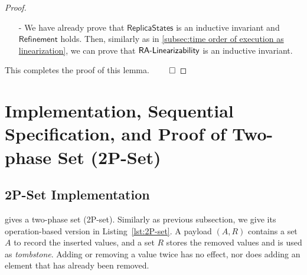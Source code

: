 \begin {proof}
\begin{itemize}
\item[-] We have already prove that $\mathsf{ReplicaStates}$ is an inductive invariant and $\mathsf{Refinement}$ holds. Then, similarly as in \sectionautorefname \ref{subsec:time order of execution as linearization}, we can prove that $\mathsf{RA\text{-}Linearizability{}}$ is an inductive invariant.
\end{itemize}

This completes the proof of this lemma. $\qed$
\end {proof}








\section{Implementation, Sequential Specification, and Proof of Two-phase Set (2P-Set)}
\label{sec:implementation, sequential specification, and proof of two-phase set (2P-set)}


\subsection{2P-Set Implementation}
\label{subsec:2P-set implementation}

\cite{ShapiroPBZ11} gives a two-phase set (2P-set). Similarly as previous subsection, we give its operation-based version in Listing~\ref{lst:2P-set}. A payload $(A,R)$ contains a set $A$ to record the inserted values, and a set $R$ stores the removed values and is used as \emph{tombstone}. Adding or removing a value twice has no effect, nor does adding an element that has already been removed.


